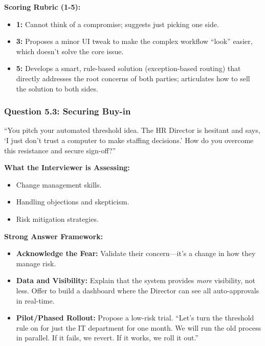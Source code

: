\textbf{Scoring Rubric (1-5):}

\begin{itemize}
\tightlist
\item
  \textbf{1:} Cannot think of a compromise; suggests just picking one
  side.
\item
  \textbf{3:} Proposes a minor UI tweak to make the complex workflow
  ``look'' easier, which doesn't solve the core issue.
\item
  \textbf{5:} Develops a smart, rule-based solution (exception-based
  routing) that directly addresses the root concerns of both parties;
  articulates how to sell the solution to both sides.
\end{itemize}

\subsubsection{Question 5.3: Securing
Buy-in}\label{question-5.3-securing-buy-in}

``You pitch your automated threshold idea. The HR Director is hesitant
and says, `I just don't trust a computer to make staffing decisions.'
How do you overcome this resistance and secure sign-off?''

\textbf{What the Interviewer is Assessing:}

\begin{itemize}
\tightlist
\item
  Change management skills.
\item
  Handling objections and skepticism.
\item
  Risk mitigation strategies.
\end{itemize}

\textbf{Strong Answer Framework:}

\begin{itemize}
\tightlist
\item
  \textbf{Acknowledge the Fear:} Validate their concern---it's a change
  in how they manage risk.
\item
  \textbf{Data and Visibility:} Explain that the system provides
  \emph{more} visibility, not less. Offer to build a dashboard where the
  Director can see all auto-approvals in real-time.
\item
  \textbf{Pilot/Phased Rollout:} Propose a low-risk trial. ``Let's turn
  the threshold rule on for just the IT department for one month. We
  will run the old process in parallel. If it fails, we revert. If it
  works, we roll it out.''
\end{itemize}

